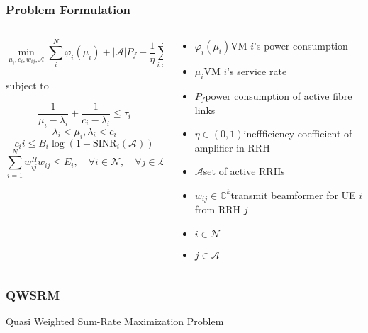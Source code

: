 \documentclass[usenames,dvipsnames]{beamer}
\begin{document}
\begin{frame}
  \frametitle{Problem Formulation}
  \vspace*{-2.5\baselineskip}
  \begin{columns}[t]
    \begin{column}{0.62\linewidth}
  \begin{exampleblock}{}
   \[
     \min_{\mu_{i},c_{i},w_{ij},\mathcal{A}}\sum_{i}^{N}\varphi_{i}(\mu_{i}) + \lvert\mathcal{A}\rvert P_{f} + \frac{1}{\eta}\sum_{i = 1}^{N}\sum_{j\in{A}}w_{ij}^{H}w_{ij}
   \]
  \end{exampleblock}
  subject to
  \begin{exampleblock}{}
    \[
      \frac{1}{\mu_{i}- \lambda_{i}} + \frac{1}{c_{i} - \lambda_{i}}\leq\tau_{i}
    \]
    \[
      \lambda_{i} < \mu_{i},\lambda_{i}<c_{i}
    \]
    \[
      c_i{i} \leq B_{i}\log(1+\text{SINR}_{i}(\mathcal{A}))
    \]
    \[
    \sum_{i=1}^{N}w_{ij}^{H}w_{ij}\leq E_{i},\quad \forall i\in \mathcal{N}, \quad \forall j\in \mathcal{L}
  \]
  \end{exampleblock}
\end{column}
\begin{column}{0.38\linewidth}
  \footnotesize\raggedright
  \begin{itemize}
    \item $\varphi_{i}(\mu_{i})$\quad VM $i$'s power consumption
    \item $\mu_{i}$\qquad VM $i$'s service rate
    \item $P_{f}$\qquad power consumption of active fibre links
    \item $\eta\in(0,1)$\quad ineffficiency coefficient of amplifier in RRH
    \item $\mathcal{A}$\qquad set of active RRHs
    \item $w_{ij}\in\mathbb{C}^{k}$\quad transmit beamformer for UE $i$ from RRH $j$
    \item $i\in\mathcal{N}$
    \item $j\in\mathcal{A}$
  \end{itemize}
\end{column}
\end{columns}
\end{frame}
\begin{frame}
  \frametitle{QWSRM}
  \begin{exampleblock}{\phantom{Tp}}
    \centering Quasi Weighted Sum-Rate Maximization Problem
  \end{exampleblock}
\end{frame}
\end{document}

